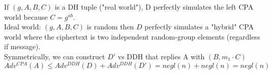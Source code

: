 \documentclass{scribe}
\begin{document}
If $(g,A,B,C)$ is a DH tuple ("real world"), D perfectly simulates the left CPA world because $C=g^{ab}$.
\\
Ideal world: $(g,A,B,C)$ is random then $D$ perfectly simulates a "hybrid" CPA world where the ciphertext is two independent random-group elements (regardless if message).
\\
Symmetrically, we can construct $D'$ vs DDH that replies A with $(B,m_1 \cdot C)$
\[Adv^{CPA}(A) \le Adv^{DDH}(D) + Adv^{DDH}(D') = negl(n)+negl(n) = negl(n)\]
\vspace{10mm}




%

\end{document}
